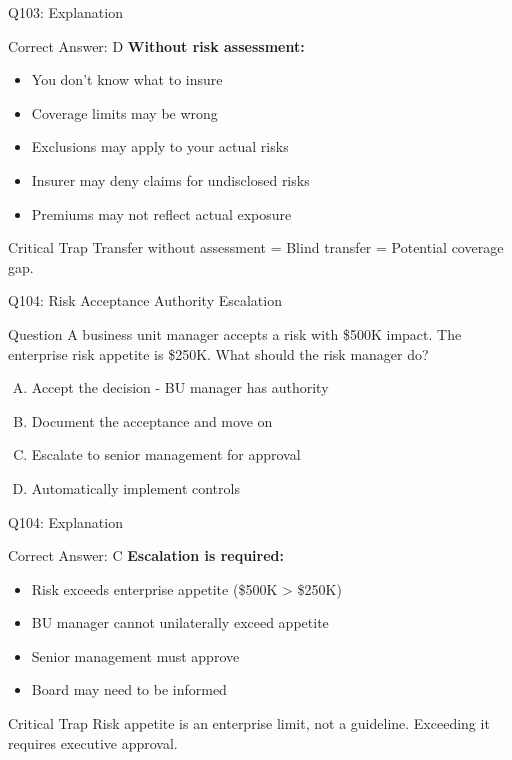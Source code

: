 \documentclass{beamer}
\begin{document}
	\begin{frame}{Q103: Explanation}
		\begin{block}{Correct Answer: D}
			\textbf{Without risk assessment:}
			\begin{itemize}
				\item You don't know what to insure
				\item Coverage limits may be wrong
				\item Exclusions may apply to your actual risks
				\item Insurer may deny claims for undisclosed risks
				\item Premiums may not reflect actual exposure
			\end{itemize}
		\end{block}
		\begin{alertblock}{Critical Trap}
			Transfer without assessment = Blind transfer = Potential coverage gap.
		\end{alertblock}
	\end{frame}
	
	\begin{frame}{Q104: Risk Acceptance Authority Escalation}
		\begin{block}{Question}
			A business unit manager accepts a risk with \$500K impact. The enterprise risk appetite is \$250K. What should the risk manager do?
		\end{block}
		\begin{enumerate}[(A)]
			\item Accept the decision - BU manager has authority
			\item Document the acceptance and move on
			\item Escalate to senior management for approval
			\item Automatically implement controls
		\end{enumerate}
	\end{frame}
	
	\begin{frame}{Q104: Explanation}
		\begin{block}{Correct Answer: C}
			\textbf{Escalation is required:}
			\begin{itemize}
				\item Risk exceeds enterprise appetite (\$500K > \$250K)
				\item BU manager cannot unilaterally exceed appetite
				\item Senior management must approve
				\item Board may need to be informed
			\end{itemize}
		\end{block}
		\begin{alertblock}{Critical Trap}
			Risk appetite is an enterprise limit, not a guideline.
			Exceeding it requires executive approval.
		\end{alertblock}
	\end{frame}
	
\end{document}

